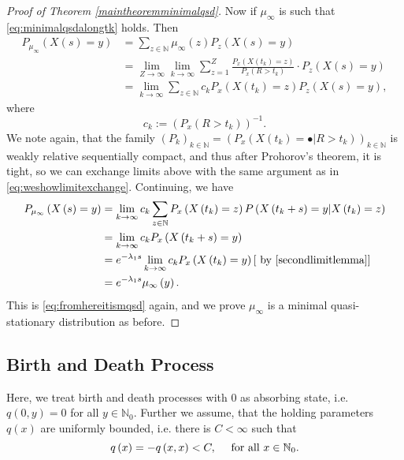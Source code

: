 \documentclass[12pt,a4paper]{scrartcl}
\numberwithin{equation}{section}
\newcommand{\N}{\mathbb{N}} %
\begin{document}
\begin{proof}[Proof of Theorem \ref{maintheoremminimalqsd}]
Now if $\mu_{\infty}$ is such that \eqref{eq:minimalqsdalongtk} holds. Then
\begin{align*}
P_{\mu_{\infty}}\left(X\left(s\right)=y \right) &= \sum_{z \in \N} \mu_{\infty}\left(z\right) P_z\left(X\left(s\right)=y \right) \\
&=\lim_{Z \to \infty} \lim_{k \to \infty} \sum_{z=1}^Z \frac{P_x\left(X\left(t_k\right)=z\right)}{P_x\left(R>t_k\right)} \cdot P_z\left(X\left(s\right)=y\right) \\
&=\lim_{k \to \infty} \sum_{z \in \N} c_k P_x\left(X\left(t_k\right)=z \right) P_z\left(X\left(s\right) = y\right),
\end{align*}
where $$c_k := \left(P_x\left(R > t_k\right) \right)^{-1}.$$
We note again, that the family $\left(P_k\right)_{k \in \N} = \left(P_x\left(X\left(t_k\right)= \bullet | R > t_k \right) \right)_{k \in \N} $ is weakly relative sequentially compact, and thus after Prohorov's theorem, it is tight, so we can exchange limits above with the same argument as in \eqref{eq:weshowlimitexchange}. Continuing, we have
\begin{align*}
P_{\mu_{\infty}}\left( X\left(s\right) = y \right) &= \lim_{k \to \infty} c_k \sum_{z \in \N} P_x\left(X\left(t_k\right)=z \right) P\left(X\left(t_k +s \right) = y | X\left(t_k\right)= z \right) \\
&= \lim_{k \to \infty} c_k P_x\left(X\left(t_k +s\right)=y \right) \\
&= e^{-\lambda_1 s} \lim_{k \to \infty} c_k P_x\left(X\left(t_k\right) = y \right) \left[\textnormal{ by \eqref{secondlimitlemma}} \right]\\
&= e^{-\lambda_1 s}\mu_{\infty}\left(y\right).
\end{align*}
This is \eqref{eq:fromhereitismqsd} again, and we prove $\mu_{\infty}$ is a minimal quasi-stationary distribution as before.



\end{proof}

\subsection{Birth and Death Process}
Here, we treat birth and death processes with $0$ as absorbing state, i.e. $q\left(0,y\right) = 0$ for all $y \in \N_0$. Further we assume, that the holding parameters $q\left(x\right)$ are uniformly bounded, i.e. there is $C < \infty$ such that 
\begin{equation} \label{eq:uniformlyboundedqmatrix}
q\left(x\right) = -q\left(x,x\right) < C, \quad \textnormal{ for all } x \in \N_0.
\end{equation}
\end{document}
